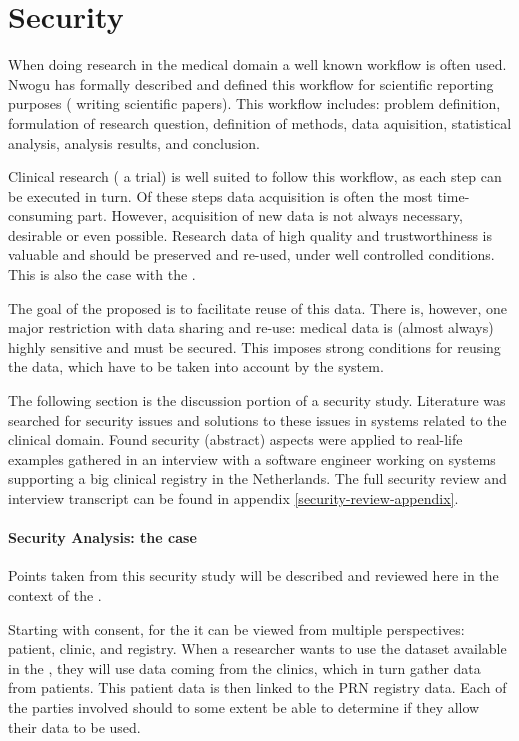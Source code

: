 \section{Security}
\label{security}

When doing research in the medical domain a well known workflow is often used. Nwogu \cite{nwogu} has formally described and defined this workflow for scientific reporting purposes (\ie{} writing scientific papers).
This workflow includes: problem definition, formulation of research question, definition of methods, data aquisition, statistical analysis, analysis results, and conclusion.

Clinical research (\eg{} a trial) is well suited to follow this workflow, as each step can be executed in turn.
Of these steps data acquisition is often the most time-consuming part.
However, acquisition of new data is not always necessary,  desirable or even possible. 
Research data of high quality and trustworthiness is valuable and should be preserved and re-used, under well controlled conditions. 
This is also the case with the \projectdata{}.

The goal of the proposed \ivfsystem{} is to facilitate reuse of this data.
There is, however, one major restriction with data sharing and re-use: medical data is (almost always) highly sensitive and must be secured. 
This imposes strong conditions for reusing the data, which have to be taken into account by the system.

The following section is the discussion portion of a security study.
Literature was searched for security issues and solutions to these issues in systems related to the clinical domain.
Found security (abstract) aspects were applied to real-life examples gathered in an interview with a software engineer working on systems supporting a big clinical registry in the Netherlands.
The full security review and interview transcript can be found in appendix \ref{security-review-appendix}.

\paragraph{Security Analysis: the \ivfsystem{} case}
\label{security-summarisation-analysis}

Points taken from this security study will be described and reviewed here in the context of the \ivfsystem{}.

Starting with consent, for the \project{} it can be viewed from multiple perspectives: patient, clinic, and registry.
When a researcher wants to use the dataset available in the \ivfsystem{}, they will use data coming from the clinics, which in turn gather data from patients.
This patient data is then linked to the PRN registry data.
Each of the parties involved should to some extent be able to determine if they allow their data to be used.

